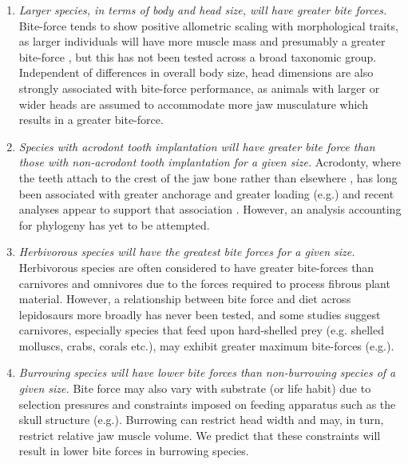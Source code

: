 \documentclass[a4paper, 12pt]{article}
\begin{document}
\begin{enumerate}

\item \textit{Larger species, in terms of body and head size, will have greater bite forces.} 
Bite-force tends to show positive allometric scaling with morphological traits, as larger individuals will have more muscle mass and presumably a greater bite-force \cite{aguirre2002ecomorphological,herrel2004omnivory,lailvaux2004performance,vanhooydonck2005does,MEASEY2009217}, but this has not been tested across a broad taxonomic group. 
Independent of differences in overall body size, head dimensions are also strongly associated with bite-force performance\cite{kaliontzopoulou2012relationships,jones2020reproductive}, as animals with larger or wider heads are assumed to accommodate more jaw musculature which results in a greater bite-force\cite{herrel1999morphology,huyghe2005morphology}.

\item \textit{Species with acrodont tooth implantation will have greater bite force than those with non-acrodont tooth implantation for a given size.} 
Acrodonty, where the teeth attach to the crest of the jaw bone rather than elsewhere \cite{smith1958evolutionary}, has long been associated with greater anchorage and greater loading (e.g.\cite{smith1958evolutionary,jones2008skull}) and recent analyses appear to support that association \cite{jenkins2020bite}.
However, an analysis accounting for phylogeny has yet to be attempted.

\item \textit{Herbivorous species will have the greatest bite forces for a given size.}
Herbivorous species are often considered to have greater bite-forces than carnivores and omnivores due to the forces required to process fibrous plant material\cite{cooper2002distribution,herrel1999morphology,metzger2005correlations,herrel2004omnivory,Herrel2008}.
However, a relationship between bite force and diet across lepidosaurs more broadly has never been tested, and some studies suggest carnivores, especially species that feed upon hard-shelled prey (e.g. shelled molluscs, crabs, corals etc.), may exhibit greater maximum bite-forces (e.g.\cite{schaerlaeken2012built}).

\item \textit{Burrowing species will have lower bite forces than non-burrowing species of a given size.}
Bite force may also vary with substrate (or life habit) due to selection pressures and constraints imposed on feeding apparatus such as the skull structure (e.g.\cite{gray2019evolution}).
Burrowing can restrict head width\cite{vanhooydonck2011push} and may, in turn, restrict relative jaw muscle volume. We predict that these constraints will result in lower bite forces in burrowing species. 

\end{enumerate}
\end{document}
